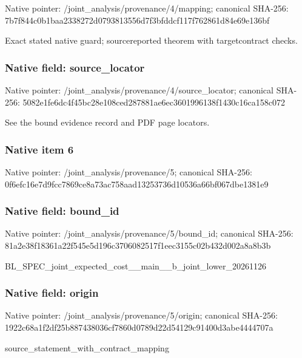 \documentclass[10pt,a4paper]{article}
\begin{document}
Native pointer: /joint\_analysis/provenance/4/mapping; canonical SHA-256: 7b7f844c0b1baa2338272d07\allowbreak{}93813556d7f3bfddcf117f76\allowbreak{}2861d84e69e136bf


Exact stated native guard; sourcereported theorem with targetcontract checks.


\subsubsection{Native field: source\_locator}


Native pointer: /joint\_analysis/provenan\allowbreak{}ce/4/source\_locator; canonical SHA-256: 5082e1fe6dc4f45bc28e108c\allowbreak{}ed287881ae6ec3601996138f\allowbreak{}1430c16ca158c072


See the bound evidence record and PDF page locators.


\subsubsection{Native item 6}


Native pointer: /joint\_analysis/provenance/5; canonical SHA-256: 0f6efc16e7d9fcc7869ce8a7\allowbreak{}3ac758aad13253736d10536a\allowbreak{}66bf067dbe1381e9



\subsubsection{Native field: bound\_id}


Native pointer: /joint\_analysis/provenance/5/bound\_id; canonical SHA-256: 81a2e38f18361a22f545e5d1\allowbreak{}96c3706082517f1eec3155c0\allowbreak{}2b432d002a8a8b3b


BL\_SPEC\_joint\_expected\_c\allowbreak{}ost\_\_main\_\_b\_joint\_lower\allowbreak{}\_20261126


\subsubsection{Native field: origin}


Native pointer: /joint\_analysis/provenance/5/origin; canonical SHA-256: 1922c68a1f2df25b88743803\allowbreak{}6cf7860d0789d22d54129c91\allowbreak{}400d3abe4444707a


source\_statement\_with\_contract\_mapping
\end{document}
